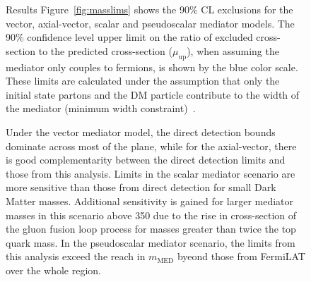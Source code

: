 \begin{figure}[hbtp]
\begin{section}{Results}
Figure~\ref{fig:masslims} shows the 90\% CL exclusions for the vector,
axial-vector, scalar and pseudoscalar mediator models.  The 90\% confidence
level upper limit on the ratio of excluded cross-section to the predicted
cross-section ($\mu_{\textrm{up}}$), when assuming the mediator only couples to
fermions, is shown by the blue color scale. These limits are calculated under
the assumption that only the initial state partons and the DM particle
contribute to the width of the mediator (minimum width
constraint)~\cite{An:2012va,Abercrombie:2015wmb,Fox:2011pm,simplified1}. 

Under the vector mediator model, the direct detection bounds dominate across
most of the plane, while for the axial-vector, there is good complementarity
between the direct detection limits and those from this analysis. Limits in the
scalar mediator scenario are more sensitive than those from direct detection for
small Dark Matter masses. Additional sensitivity is gained for larger mediator
masses in this scenario above 350 \GeV due to the rise in cross-section of the
gluon fusion loop process for masses greater than twice the top quark mass. In
the pseudoscalar mediator scenario, the limits from this analysis exceed the
reach in $m_{\mathrm{MED}}$ byeond those from FermiLAT over the whole region.


\end{section}
\end{figure}
